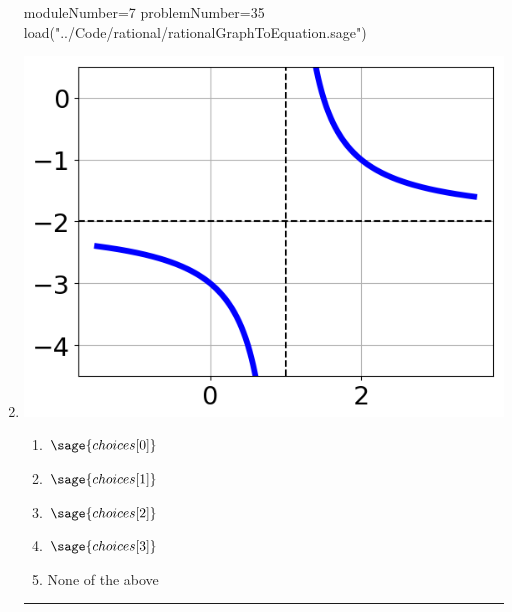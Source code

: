 \documentclass[14pt]{article}
\newcommand{\litem}[1]{\item#1\hspace*{-1cm}\rule{\textwidth}{0.4pt}}
\begin{document}
\begin{enumerate}
\begin{sagesilent}
moduleNumber=7
problemNumber=35
load("../Code/rational/rationalGraphToEquation.sage")
\end{sagesilent}

\litem{ 

\begin{multicols}{2}
\begin{center}
\includegraphics[width=.3\textwidth]{../Figures/rationalGraphToEquationA.png}
\end{center}

\columnbreak

	\begin{enumerate}[label=\Alph*.]
		\item \( \sage{choices[0]} \)
		\item \( \sage{choices[1]} \)
		\item \( \sage{choices[2]} \)
		\item \( \sage{choices[3]} \)
    \item None of the above
	\end{enumerate}
\end{multicols}
}

\end{enumerate}
\end{document}

